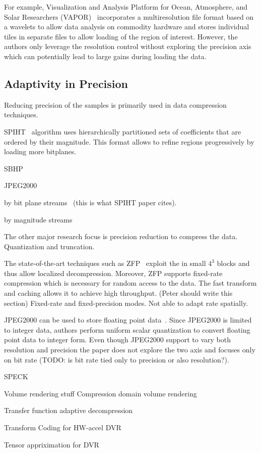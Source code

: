 For example, Visualization and Analysis Platform for Ocean, Atmosphere, and Solar Researchers
(VAPOR)~\cite{multires_toolkit2003, vapor2007} incorporates a multiresolution file
format based on a wavelets to allow data analysis on commodity hardware and stores individual tiles in
separate files to allow loading of the region of interest.
However, the authors only leverage the resolution control without exploring the precision axis
which can potentially lead to large gains during loading the data.


\subsection{Adaptivity in Precision}
Reducing precision of the samples is primarily used in data compression techniques. 

SPIHT~\cite{spiht1996} algorithm uses hierarchically partitioned sets of coefficients that
are ordered by their magnitude. This format allows to refine regions progressively by loading
more bitplanes.


SBHP~\cite{sbhp2000}

JPEG2000~\cite{jpeg2001}

by bit plane streams~\cite{compression_techniques1991} (this is what SPIHT paper cites).


by magnitude streams~\cite{image_compression1992}


The other major research focus is precision reduction to compress the data. Quantization and
truncation.



The state-of-the-art techniques such as ZFP~\cite{zfp2014} exploit the in small $4^3$ blocks
and thus allow localized decompression. Moreover, ZFP supports fixed-rate compression which
is necessary for random access to the data. The fast transform and caching allows it to
achieve high throughput. (Peter should write this section)
Fixed-rate and fixed-precision modes. Not able to adapt rate spatially.

JPEG2000 can be used to store floating point data~\cite{woodring2011}. Since JPEG2000 is limited
to integer data, authors perform uniform scalar quantization to convert floating point data to integer
form. Even though JPEG2000 support to vary both resolution and precision the paper does not explore
the two axis and focuses only on bit rate (TODO: is bit rate tied only to precision or also resolution?).


SPECK~\cite{speck2004}



Volume rendering stuff
Compression domain volume rendering~\cite{compression_domain2003}

Transfer function adaptive decompression~\cite{tf_decompression2004}

Transform Coding for HW-accel DVR~\cite{hw_dvr2007}

Tensor appriximation for DVR~\cite{tensor_dvr2015}



